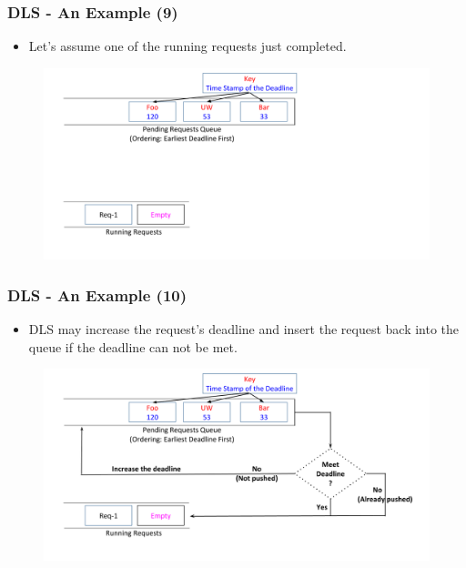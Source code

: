 \documentclass{beamer}
\begin{document}
\begin{frame}
  \frametitle{DLS - An Example (9)}
  \begin{itemize}
  \item Let's assume one of the running requests just completed.
    \newline
    \newline
  \end{itemize}
  \begin{figure}
    \begin{center}
      \centerline{\includegraphics[scale=0.33]{img/DLS_Example8_3.png}}
    \end{center}
  \end{figure}
\end{frame}

\begin{frame}
  \frametitle{DLS - An Example (10)}
  \begin{itemize}
  \item DLS may increase the request's deadline and insert the request back
    into the queue if the deadline can not be met.
    \newline
  \end{itemize}
  \begin{figure}
    \begin{center}
      \centerline{\includegraphics[scale=0.33]{img/DLS_Example8_4.png}}
    \end{center}
  \end{figure}
\end{frame}
\end{document}

